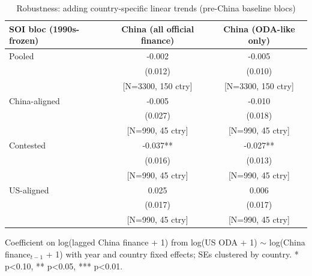 \begin{table}[htbp]
\centering
\caption{Robustness: adding country-specific linear trends (pre-China baseline blocs)}
\label{tab:soi-trends}
\begin{tabular}{lcc}
\toprule
SOI bloc (1990s-frozen) & China (all official finance) & China (ODA-like only) \\
\midrule
Pooled & -0.002 & -0.005 \\
 & (0.012) & (0.010) \\
 & [N=3300, 150 ctry] & [N=3300, 150 ctry] \\[2pt]
China-aligned & -0.005 & -0.010 \\
 & (0.027) & (0.018) \\
 & [N=990, 45 ctry] & [N=990, 45 ctry] \\[2pt]
Contested & -0.037** & -0.027** \\
 & (0.016) & (0.013) \\
 & [N=990, 45 ctry] & [N=990, 45 ctry] \\[2pt]
US-aligned & 0.025 & 0.006 \\
 & (0.017) & (0.017) \\
 & [N=990, 45 ctry] & [N=990, 45 ctry] \\[2pt]
\bottomrule
\end{tabular}
\begin{minipage}{0.9\textwidth}
\vspace{4pt}
\footnotesize Coefficient on log(lagged China finance + 1) from
log(US ODA + 1) $\sim$ log(China finance$_{t-1}$ + 1) with year and
country fixed effects; SEs clustered by country. * p<0.10, ** p<0.05, *** p<0.01.
\end{minipage}
\end{table}
